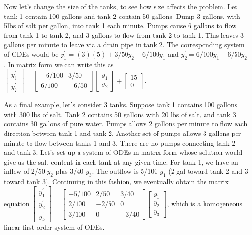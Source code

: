 Now let's change the size of the tanks, to see how size affects the problem.  Let tank 1 contain 100 gallons and tank 2 contain 50 gallons. Dump 3 gallons, with 5lbs of salt per gallon, into tank 1 each minute.  Pumps cause 6 gallons to flow from tank 1 to tank 2, and 3 gallons to flow from tank 2 to tank 1.  This leaves 3 gallons per minute to leave via a drain pipe in tank 2. The corresponding system of ODEs would be $y_1^\prime = (3)(5) + 3/50 y_2 - 6/100 y_1$ and $y_2^\prime = 6/100 y_1 - 6/50 y_2$. In matrix form we can write this as  
$
\begin{bmatrix}
y_1^\prime\\
y_2^\prime
\end{bmatrix}
=
\begin{bmatrix}
-6/100&3/50\\
6/100&-6/50
\end{bmatrix}
\begin{bmatrix}
y_1\\
y_2
\end{bmatrix}
+
\begin{bmatrix}
15\\
0
\end{bmatrix}$.

As a final example, let's consider 3 tanks.  Suppose tank 1 contains 100 gallons with 300 lbs of salt.  Tank 2 contains 50 gallons with 20 lbs of salt, and tank 3 contains 30 gallons of pure water.  Pumps allows 2 gallons per minute to flow each direction between tank 1 and tank 2.  Another set of pumps allows 3 gallons per minute to flow between tanks 1 and 3.  There are no pumps connecting tank 2 and tank 3. Let's set up a system of ODEs in matrix form whose solution would give us the salt content in each tank at any given time.  For tank 1, we have an inflow of 2/50 $y_2$ plus 3/40 $y_3$. The outflow is 5/100 $y_1$ (2 gal toward tank 2 and 3 toward tank 3).  Continuing in this fashion, we eventually obtain the matrix equation
$
\begin{bmatrix}
y_1^\prime\\
y_2^\prime\\
y_3^\prime
\end{bmatrix}
=
\begin{bmatrix}
-5/100&2/50 &3/40\\
2/100 &-2/50&0\\
3/100 &0    &-3/40
\end{bmatrix}
\begin{bmatrix}
y_1\\
y_2\\
y_3
\end{bmatrix}
$, which is a homogeneous linear first order system of ODEs.



